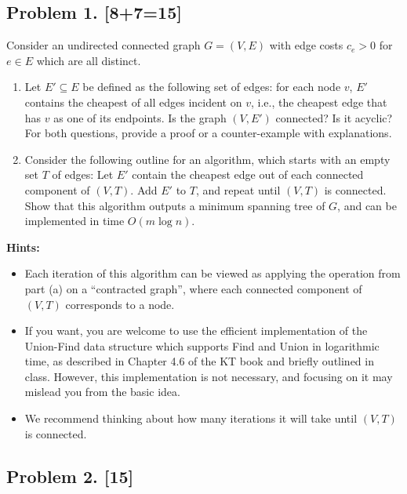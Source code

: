\documentclass[10pt]{article}
\begin{document}
\newpage

\subsection*{Problem 1. [8+7=15]}

Consider an undirected connected graph $G=(V,E)$ with edge costs $c_e > 0$ for $e \in E$ which are all distinct.
  
\begin{enumerate}
\item Let $E' \subseteq E$ be defined as the following set of edges: for each node $v$, $E'$ contains the cheapest of all edges incident on $v$, i.e., the cheapest edge that has $v$ as one of its endpoints. Is the graph $(V,E')$ connected? Is it acyclic? For both questions, provide a proof or a counter-example with explanations.

\item Consider the following outline for an algorithm, which starts with an empty set $T$ of edges: Let $E'$ contain the cheapest edge out of each connected component of $(V,T)$. Add $E'$ to $T$, and repeat until $(V,T)$ is connected. Show that this algorithm outputs a minimum spanning tree of $G$, and can be implemented in time $O(m \log n)$. 
\end{enumerate}

\noindent \textbf{Hints:}
\begin{itemize}
  \renewcommand{\labelitemi}{$\bullet$}
  \item Each iteration of this algorithm can be viewed as applying the operation from part (a) on a ``contracted graph'', where each connected component of $(V,T)$ corresponds to a node.
  \item If you want, you are welcome to use the efficient implementation of the Union-Find data structure which supports Find and Union in logarithmic time, as described in Chapter 4.6 of the KT book and briefly outlined in class. However, this implementation is not necessary, and focusing on it may mislead you from the basic idea.
  \item We recommend thinking about how many iterations it will take until $(V,T)$ is connected.
\end{itemize}


\subsection*{Problem 2. [15]}
\end{document}
